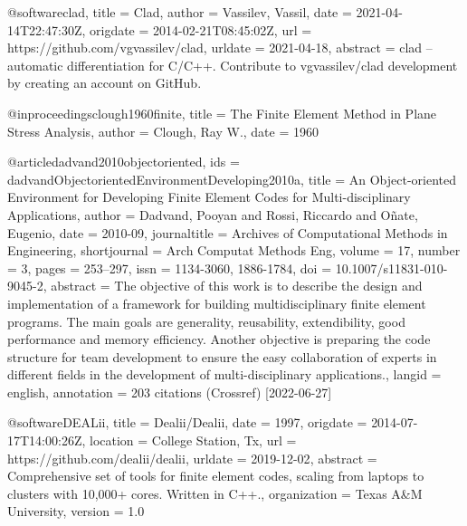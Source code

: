 @software{clad,
  title = {Clad},
  author = {Vassilev, Vassil},
  date = {2021-04-14T22:47:30Z},
  origdate = {2014-02-21T08:45:02Z},
  url = {https://github.com/vgvassilev/clad},
  urldate = {2021-04-18},
  abstract = {clad -- automatic differentiation for C/C++. Contribute to vgvassilev/clad development by creating an account on GitHub.}
}

@inproceedings{clough1960finite,
  title = {The Finite Element Method in Plane Stress Analysis},
  author = {Clough, Ray W.},
  date = {1960}
}

@article{dadvand2010objectoriented,
  ids = {dadvandObjectorientedEnvironmentDeveloping2010a},
  title = {An {{Object-oriented Environment}} for {{Developing Finite Element Codes}} for {{Multi-disciplinary Applications}}},
  author = {Dadvand, Pooyan and Rossi, Riccardo and Oñate, Eugenio},
  date = {2010-09},
  journaltitle = {Archives of Computational Methods in Engineering},
  shortjournal = {Arch Computat Methods Eng},
  volume = {17},
  number = {3},
  pages = {253--297},
  issn = {1134-3060, 1886-1784},
  doi = {10.1007/s11831-010-9045-2},
  abstract = {The objective of this work is to describe the design and implementation of a framework for building multidisciplinary finite element programs. The main goals are generality, reusability, extendibility, good performance and memory efficiency. Another objective is preparing the code structure for team development to ensure the easy collaboration of experts in different fields in the development of multi-disciplinary applications.},
  langid = {english},
  annotation = {203 citations (Crossref) [2022-06-27]}
}

@software{DEALii,
  title = {Dealii/Dealii},
  date = {1997},
  origdate = {2014-07-17T14:00:26Z},
  location = {College Station, Tx},
  url = {https://github.com/dealii/dealii},
  urldate = {2019-12-02},
  abstract = {Comprehensive set of tools for finite element codes, scaling from laptops to clusters with 10,000+ cores. Written in C++.},
  organization = {Texas A\&M University},
  version = {1.0}
}

